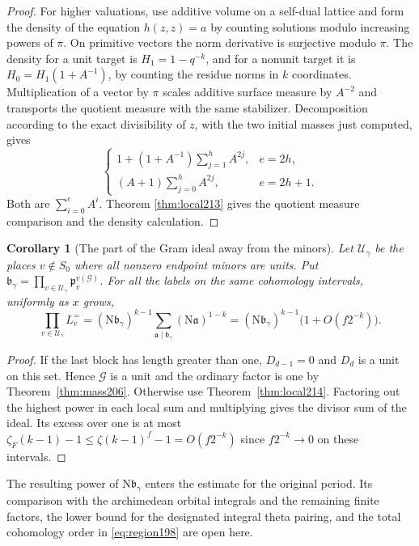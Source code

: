 \documentclass[a4paper,11pt]{article}
\newtheorem{corollary}[proposition]{Corollary}
\theoremstyle{definition}
\theoremstyle{remark}
\numberwithin{equation}{section}
\begin{document}
\begin{proof}
For higher valuations, use additive volume on a self-dual
lattice and form the density of the equation \(h(z,z)=a\)
by counting solutions modulo increasing powers of \(\pi\).
On primitive vectors the norm derivative is surjective modulo
\(\pi\). The density for a unit target is \(H_1=1-q^{-k}\),
and for a nonunit target it is \(H_0=H_1(1+A^{-1})\), by
counting the residue norms in \(k\) coordinates. Multiplication
of a vector by \(\pi\) scales additive surface measure by
\(A^{-2}\) and transports the quotient measure with the same
stabilizer. Decomposition according to the exact divisibility
of \(z\), with the two initial masses just computed, gives
\[
 \begin{cases}
  1+(1+A^{-1})\sum_{j=1}^h A^{2j},&e=2h,\\
  (A+1)\sum_{j=0}^h A^{2j},&e=2h+1 .
 \end{cases}
\]
Both are \(\sum_{i=0}^{e}A^i\).
Theorem \ref{thm:local213}
gives the quotient measure comparison and the density calculation.
\end{proof}

\begin{corollary}[The part of the Gram ideal away from the minors]
\label{cor:product214}
Let \(\mathcal U_\gamma\) be the places \(v\notin S_0\) where all
nonzero endpoint minors are units. Put
\(\mathfrak b_\gamma=\prod_{v\in\mathcal U_\gamma}
\mathfrak p_v^{v(\mathcal G)}\). For all the labels on the same
cohomology intervals, uniformly as \(x\) grows,
\[
 \prod_{v\in\mathcal U_\gamma}L_v^{=}
 =(\mathrm N\mathfrak b_\gamma)^{k-1}
      \sum_{\mathfrak a\mid\mathfrak b_\gamma}(\mathrm N\mathfrak a)^{1-k}
 =(\mathrm N\mathfrak b_\gamma)^{k-1}\bigl(1+O(f2^{-k})\bigr).
\]
\end{corollary}
\begin{proof}
If the last block has length greater than one, \(D_{d-1}=0\)
and \(D_d\) is a unit on this set. Hence \(\mathcal G\) is a unit
and the ordinary factor is one by Theorem~\ref{thm:mass206}.
Otherwise use Theorem~\ref{thm:local214}. Factoring out the
highest power in each local sum and multiplying gives the
divisor sum of the ideal. Its excess over one is at most
\(\zeta_F(k-1)-1\le\zeta(k-1)^f-1=O(f2^{-k})\) since
\(f2^{-k}\to0\) on these intervals.
\end{proof}

The resulting power of \(\mathrm N\mathfrak b_\gamma\) enters
the estimate for the original period. Its comparison with the
archimedean orbital integrals and the remaining finite factors,
the lower bound for the designated integral theta pairing, and
the total cohomology order in \eqref{eq:region198} are open here.
\end{document}

